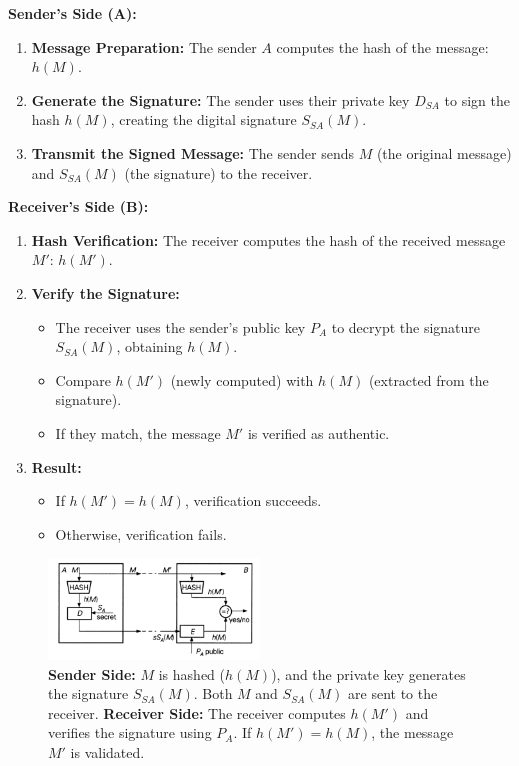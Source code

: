 \textbf{Sender's Side (A):}
\begin{enumerate}
    \item \textbf{Message Preparation:} The sender \(A\) computes the hash of the message: \(h(M)\).
    \item \textbf{Generate the Signature:} The sender uses their private key \(D_{SA}\) to sign the hash \(h(M)\), creating the digital signature \(S_{SA}(M)\).
    \item \textbf{Transmit the Signed Message:} The sender sends \(M\) (the original message) and \(S_{SA}(M)\) (the signature) to the receiver.
\end{enumerate}

\textbf{Receiver's Side (B):}
\begin{enumerate}
    \item \textbf{Hash Verification:} The receiver computes the hash of the received message \(M'\): \(h(M')\).
    \item \textbf{Verify the Signature:}
    \begin{itemize}
        \item The receiver uses the sender's public key \(P_A\) to decrypt the signature \(S_{SA}(M)\), obtaining \(h(M)\).
        \item Compare \(h(M')\) (newly computed) with \(h(M)\) (extracted from the signature).
        \item If they match, the message \(M'\) is verified as authentic.
    \end{itemize}
    \item \textbf{Result:}
    \begin{itemize}
        \item If \(h(M') = h(M)\), verification succeeds.
        \item Otherwise, verification fails.
    \end{itemize}
\end{enumerate}


\begin{figure}[h!]
    \centering
    \includegraphics[width=0.5\textwidth]{img/signing.png}
    \caption{\textbf{Sender Side:}
\(M\) is hashed (\(h(M)\)), and the private key generates the signature \(S_{SA}(M)\).
Both \(M\) and \(S_{SA}(M)\) are sent to the receiver.
\textbf{Receiver Side:}
The receiver computes \(h(M')\) and verifies the signature using \(P_A\).
If \(h(M') = h(M)\), the message \(M'\) is validated.}
\end{figure}

